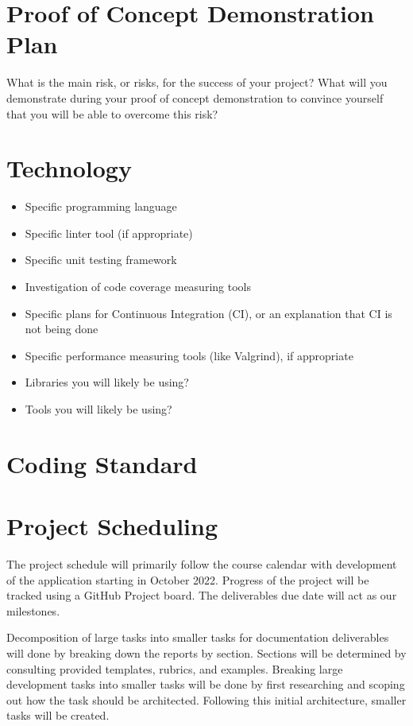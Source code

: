 \documentclass{article}
\begin{document}
\section{Proof of Concept Demonstration Plan}

What is the main risk, or risks, for the success of your project?  What will you
demonstrate during your proof of concept demonstration to convince yourself that
you will be able to overcome this risk?

\section{Technology}

\begin{itemize}
\item Specific programming language
\item Specific linter tool (if appropriate)
\item Specific unit testing framework
\item Investigation of code coverage measuring tools
\item Specific plans for Continuous Integration (CI), or an explanation that CI
  is not being done
\item Specific performance measuring tools (like Valgrind), if
  appropriate
\item Libraries you will likely be using?
\item Tools you will likely be using?
\end{itemize}

\section{Coding Standard}

\section{Project Scheduling}


The project schedule will primarily follow the course calendar with development of the application
starting in October 2022. Progress of the project will be tracked using a GitHub Project board. The
deliverables due date will act as our milestones.

Decomposition of large tasks into smaller tasks for documentation deliverables will done by breaking
down the reports by section. Sections will be determined by consulting provided templates, rubrics,
and examples. Breaking large development tasks into smaller tasks will be done by first researching
and scoping out how the task should be architected. Following this initial architecture, smaller
tasks will be created.
\end{document}
